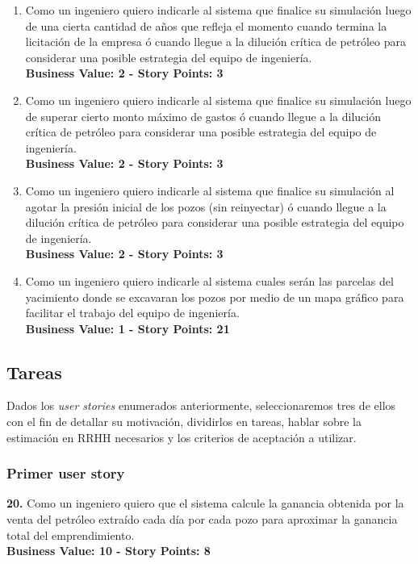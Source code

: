 \begin{enumerate}
  \item Como un ingeniero quiero indicarle al sistema que finalice su simulación luego de una cierta cantidad de años que refleja el momento cuando termina la licitación de la empresa ó cuando llegue a la dilución crítica de petróleo para considerar una posible estrategia del equipo de ingeniería.\\
  \textbf{Business Value: 2 - Story Points: 3}
  
  \item Como un ingeniero quiero indicarle al sistema que finalice su simulación luego de superar cierto monto máximo de gastos ó cuando llegue a la dilución crítica de petróleo para considerar una posible estrategia del equipo de ingeniería.\\
  \textbf{Business Value: 2 - Story Points: 3}
  
  \item Como un ingeniero quiero indicarle al sistema que finalice su simulación al agotar la presión inicial de los pozos (sin reinyectar) ó cuando llegue a la dilución crítica de petróleo para considerar una posible estrategia del equipo de ingeniería.\\
  \textbf{Business Value: 2 - Story Points: 3}
  
  \item Como un ingeniero quiero indicarle al sistema cuales serán las parcelas del yacimiento donde se excavaran los pozos por medio de un mapa gráfico para facilitar el trabajo del equipo de ingeniería.\\
  \textbf{Business Value: 1 - Story Points: 21}
\end{enumerate}


\subsection{Tareas}

Dados los \textit{user stories} enumerados anteriormente, seleccionaremos tres de ellos con el fin de detallar su motivación, dividirlos en tareas, hablar sobre la estimación en RRHH necesarios y los criterios de aceptación a utilizar.

\subsubsection{Primer user story}

\textbf{20.} Como un ingeniero quiero que el sistema calcule la ganancia obtenida por la venta del petróleo extraído cada día por cada pozo para aproximar la ganancia total del emprendimiento.\\
\textbf{Business Value: 10 - Story Points: 8}\\

